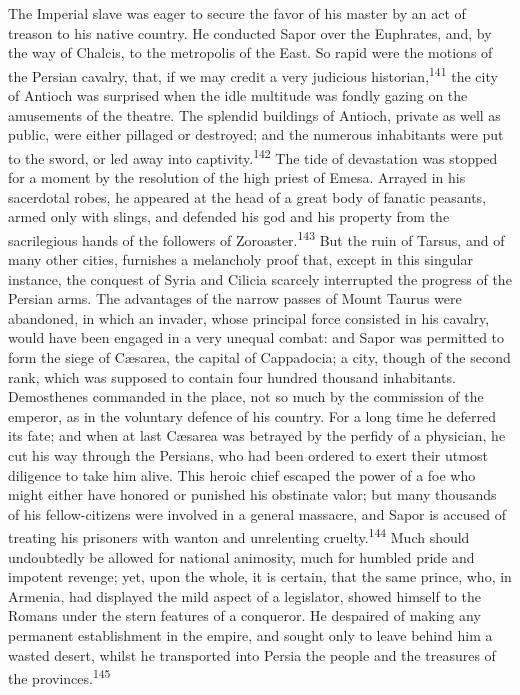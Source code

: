 



The Imperial slave was eager to secure the favor of his master by
an act of treason to his native country. He conducted Sapor over
the Euphrates, and, by the way of Chalcis, to the metropolis of
the East. So rapid were the motions of the Persian cavalry, that,
if we may credit a very judicious historian,\textsuperscript{141} the city of
Antioch was surprised when the idle multitude was fondly gazing
on the amusements of the theatre. The splendid buildings of
Antioch, private as well as public, were either pillaged or
destroyed; and the numerous inhabitants were put to the sword, or
led away into captivity.\textsuperscript{142} The tide of devastation was stopped
for a moment by the resolution of the high priest of Emesa.
Arrayed in his sacerdotal robes, he appeared at the head of a
great body of fanatic peasants, armed only with slings, and
defended his god and his property from the sacrilegious hands of
the followers of Zoroaster.\textsuperscript{143} But the ruin of Tarsus, and of
many other cities, furnishes a melancholy proof that, except in
this singular instance, the conquest of Syria and Cilicia
scarcely interrupted the progress of the Persian arms. The
advantages of the narrow passes of Mount Taurus were abandoned,
in which an invader, whose principal force consisted in his
cavalry, would have been engaged in a very unequal combat: and
Sapor was permitted to form the siege of Cæsarea, the capital of
Cappadocia; a city, though of the second rank, which was supposed
to contain four hundred thousand inhabitants. Demosthenes
commanded in the place, not so much by the commission of the
emperor, as in the voluntary defence of his country. For a long
time he deferred its fate; and when at last Cæsarea was betrayed
by the perfidy of a physician, he cut his way through the
Persians, who had been ordered to exert their utmost diligence to
take him alive. This heroic chief escaped the power of a foe who
might either have honored or punished his obstinate valor; but
many thousands of his fellow-citizens were involved in a general
massacre, and Sapor is accused of treating his prisoners with
wanton and unrelenting cruelty.\textsuperscript{144} Much should undoubtedly be
allowed for national animosity, much for humbled pride and
impotent revenge; yet, upon the whole, it is certain, that the
same prince, who, in Armenia, had displayed the mild aspect of a
legislator, showed himself to the Romans under the stern features
of a conqueror. He despaired of making any permanent
establishment in the empire, and sought only to leave behind him
a wasted desert, whilst he transported into Persia the people and
the treasures of the provinces.\textsuperscript{145}

